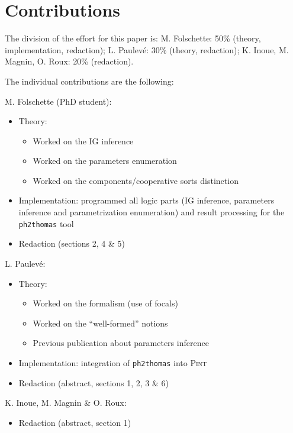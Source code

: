 \appendix
\section*{Contributions}

The division of the effort for this paper is: M. Folschette: 50\% (theory, implementation, redaction); L. Paulev\'e: 30\%
(theory, redaction); K. Inoue, M. Magnin, O. Roux: 20\% (redaction).

\medskip

The individual contributions are the following:

\medskip

\noindent
M. Folschette (PhD student):
\begin{itemize}
  \item Theory:
  \begin{itemize}
    \item Worked on the IG inference
    \item Worked on the parameters enumeration
    \item Worked on the components/cooperative sorts distinction
  \end{itemize}
  \item Implementation: programmed all logic parts (IG inference, parameters inference and parametrization enumeration) and result processing for the \texttt{ph2thomas} tool
  \item Redaction (sections 2, 4 \& 5)
\end{itemize}

\noindent
L. Paulevé:
\begin{itemize}
  \item Theory:
  \begin{itemize}
    \item Worked on the formalism (use of focals)
    \item Worked on the “well-formed” notions
    \item Previous publication about parameters inference
  \end{itemize}
  \item Implementation: integration of \texttt{ph2thomas} into \textsc{Pint}
  \item Redaction (abstract, sections 1, 2, 3 \& 6)
\end{itemize}

\noindent
K. Inoue, M. Magnin \& O. Roux:
\begin{itemize}
  \item Redaction (abstract, section 1)
\end{itemize}
